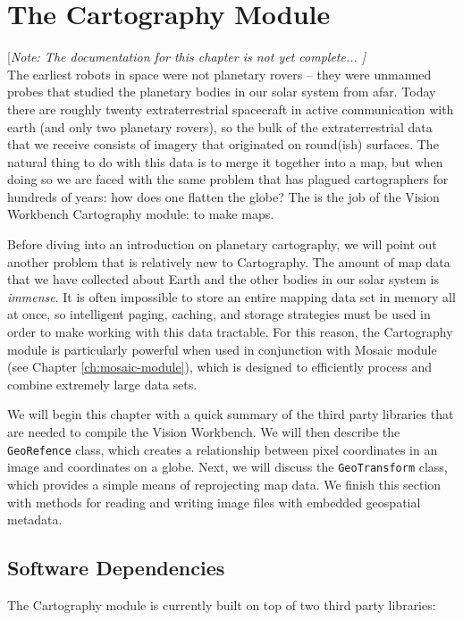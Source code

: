 \chapter{The Cartography Module}\label{ch:cartography-module}

[{\em Note: The documentation for this chapter is not yet complete... ]}
$$
$$ 
The earliest robots in space were not planetary rovers -- they were
unmanned probes that studied the planetary bodies in our solar system
from afar.  Today there are roughly twenty extraterrestrial spacecraft
in active communication with earth (and only two planetary rovers), so
the bulk of the extraterrestrial data that we receive consists of
imagery that originated on round(ish) surfaces.  The natural thing to
do with this data is to merge it together into a map, but when doing
so we are faced with the same problem that has plagued cartographers
for hundreds of years: how does one flatten the globe?  The is the job
of the Vision Workbench Cartography module: to make maps.

Before diving into an introduction on planetary cartography, we will
point out another problem that is relatively new to Cartography.  The
amount of map data that we have collected about Earth and the other
bodies in our solar system is {\em immense}.  It is often impossible
to store an entire mapping data set in memory all at once, so
intelligent paging, caching, and storage strategies must be used in
order to make working with this data tractable.  For this reason, the
Cartography module is particularly powerful when used in conjunction
with Mosaic module (see Chapter \ref{ch:mosaic-module}), which is
designed to efficiently process and combine extremely large data sets.

We will begin this chapter with a quick summary of the third party
libraries that are needed to compile the Vision Workbench.  We will
then describe the \verb#GeoRefence# class, which creates a
relationship between pixel coordinates in an image and coordinates on
a globe.  Next, we will discuss the \verb#GeoTransform# class, which
provides a simple means of reprojecting map data.  We finish this
section with methods for reading and writing image files with embedded
geospatial metadata.

\section{Software Dependencies}

The Cartography module is currently built on top of two third party
libraries:

